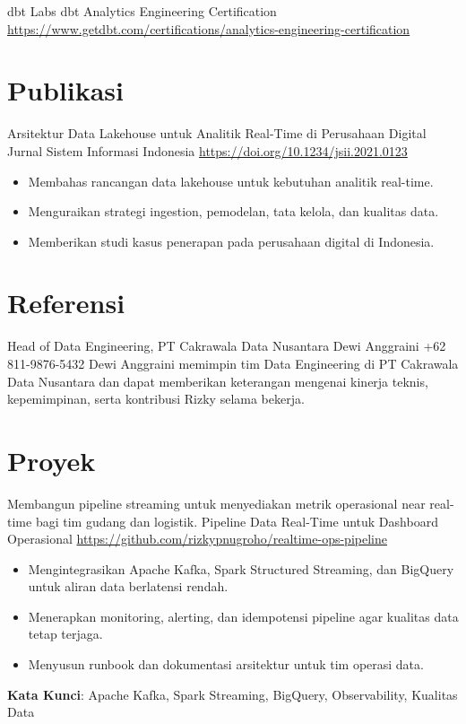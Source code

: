\documentclass[a4paper, serif, 10pt]{moderncv}
\begin{document}
        {dbt Labs}
        {dbt Analytics Engineering Certification}
        {\url{https://www.getdbt.com/certifications/analytics-engineering-certification}}
        {}
        {}
\section{Publikasi}

        {Arsitektur Data Lakehouse untuk Analitik Real-Time di Perusahaan Digital}
        {Jurnal Sistem Informasi Indonesia}
        {\url{https://doi.org/10.1234/jsii.2021.0123}}
        {}
        {\begin{itemize}
\item Membahas rancangan data lakehouse untuk kebutuhan analitik real-time.
\item Menguraikan strategi ingestion, pemodelan, tata kelola, dan kualitas data.
\item Memberikan studi kasus penerapan pada perusahaan digital di Indonesia.
\end{itemize}}
\section{Referensi}

        {Head of Data Engineering, PT Cakrawala Data Nusantara}
        {Dewi Anggraini}
        {+62 811-9876-5432}
        {}
        {Dewi Anggraini memimpin tim Data Engineering di PT Cakrawala Data Nusantara dan dapat memberikan keterangan mengenai kinerja teknis, kepemimpinan, serta kontribusi Rizky selama bekerja.}
\section{Proyek}

        {Membangun pipeline streaming untuk menyediakan metrik operasional near real-time bagi tim gudang dan logistik.}
        {Pipeline Data Real-Time untuk Dashboard Operasional}
        {\url{https://github.com/rizkypnugroho/realtime-ops-pipeline}}
        {}
        {\begin{itemize}
\item Mengintegrasikan Apache Kafka, Spark Structured Streaming, dan BigQuery untuk aliran data berlatensi rendah.
\item Menerapkan monitoring, alerting, dan idempotensi pipeline agar kualitas data tetap terjaga.
\item Menyusun runbook dan dokumentasi arsitektur untuk tim operasi data.
\end{itemize}
\textbf{Kata Kunci}: Apache Kafka, Spark Streaming, BigQuery, Observability, Kualitas Data}
\end{document}
